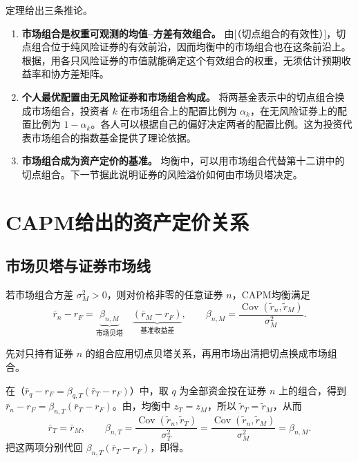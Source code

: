 定理给出三条推论。
\begin{enumerate}
 \item \textbf{市场组合是权重可观测的均值--方差有效组合。} 由[（切点组合的有效性）]，切点组合位于纯风险证券的有效前沿，因而均衡中的市场组合也在这条前沿上。根据，用各只风险证券的市值就能确定这个有效组合的权重，无须估计预期收益率和协方差矩阵。
 \item \textbf{个人最优配置由无风险证券和市场组合构成。} 将两基金表示中的切点组合换成市场组合，投资者 $k$ 在市场组合上的配置比例为 $\alpha_k$，在无风险证券上的配置比例为 $1-\alpha_k$。各人可以根据自己的偏好决定两者的配置比例。这为投资代表市场组合的指数基金提供了理论依据。
 \item \textbf{市场组合成为资产定价的基准。} 均衡中，可以用市场组合代替第十二讲中的切点组合。下一节据此说明证券的风险溢价如何由市场贝塔决定。
\end{enumerate}

\section{CAPM给出的资产定价关系}\label{sec:wj-thirteen-3}
\subsection{市场贝塔与证券市场线}
\begin{tcolorbox}[knowledge]
 若市场组合方差 $\sigma_M^2>0$，则对价格非零的任意证券 $n$，CAPM均衡满足
\begin{equation}
 \bar r_n-r_F
 =\underbrace{\beta_{n,M}}_{\text{市场贝塔}}\quad
  \underbrace{(\bar r_M-r_F)}_{\text{基准收益差}},\qquad
 \beta_{n,M}=\frac{\operatorname{Cov}(\widetilde r_n,\widetilde r_M)}{\sigma_M^2}.
 \label{eq:wj-13-3}
\end{equation}
\end{tcolorbox}

先对只持有证券 $n$ 的组合应用切点贝塔关系，再用市场出清把切点换成市场组合。

\begin{solution}[label-content={证明},blank-type=none]
在（$\bar r_q-r_F=\beta_{q,T}(\bar r_T-r_F)$）中，取 $q$ 为全部资金投在证券 $n$ 上的组合，得到 $\bar r_n-r_F=\beta_{n,T}(\bar r_T-r_F)$。由，均衡中 $z_T=z_M$，所以 $\widetilde r_T=\widetilde r_M$，从而
\[
 \bar r_T=\bar r_M,\qquad
 \beta_{n,T}=\frac{\operatorname{Cov}(\widetilde r_n,\widetilde r_T)}{\sigma_T^2}
 =\frac{\operatorname{Cov}(\widetilde r_n,\widetilde r_M)}{\sigma_M^2}
 =\beta_{n,M}.
\]
把这两项分别代回 $\beta_{n,T}(\bar r_T-r_F)$，即得。
\end{solution}

